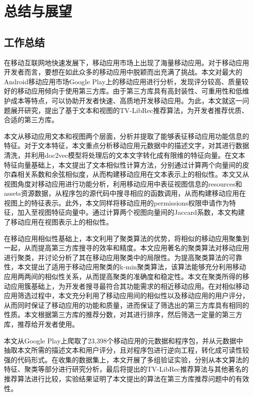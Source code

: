 \chapter{总结与展望}

\section{工作总结}
在移动互联网地快速发展下，移动应用市场上出现了海量移动应用。对于移动应用开发者而言，要想在如此众多的移动应用中脱颖而出充满了挑战。本文对最大的Android移动应用市场Google Play上的移动应用进行分析，发现评分较高、质量较好的移动应用倾向于使用第三方库。由于第三方库具有高封装性、可重用性和低维护成本等特点，可以协助开发者快速、高质地开发移动应用。为此，本文就这一问题展开研究，提出了基于文本和视图的TV-LibRec推荐算法，为开发者推荐优质、合适的第三方库。

本文从移动应用文本和视图两个层面，分析并提取了能够表征移动应用功能信息的特征。对于文本特征，本文重点分析移动应用元数据中的描述文字，对其进行数据清洗，并利用doc2vec模型将处理后的文本文字转化成有限维的特征向量。在文本特征向量基础上，本文提出了文本相似性计算方法，分别通过计算两个向量间的皮尔森相关系数和余弦相似度，从而构建移动应用在文本表示上的相似性。本文又从视图角度对移动应用进行功能分析，利用移动应用中表征视图信息的resources和assets资源数据，从程序包的源代码中搜寻相应的函数调用，从而构建移动应用在视图上的特征表示。此外，本文同样将移动应用的permissions权限申请作为特征，加入至视图特征向量中。通过计算两个视图向量间的Jaccard系数，本文构建了移动应用在视图表示上的相似性。

在移动应用相似性基础上，本文利用了聚类算法的优势，将相似的移动应用聚集到一起，从而提高第三方库搜寻的效率和精度。本文应用著名的聚类算法对移动应用进行聚类，并讨论分析了其在移动应用聚类中的局限性。为提高聚类算法的可靠性，本文提出了适用于移动应用聚类的k-min聚类算法，该算法能够充分利用移动应用两两间的相似性关系，从而提高聚类的准确度和稳定性。本文在聚类所得的移动应用簇基础上，为开发者搜寻最符合其功能需求的相近移动应用。在对相似移动应用筛选过程中，本文充分利用了移动应用间的相似性以及移动应用的用户评分，从而同时保证了移动应用的功能和质量，进而保证了筛选出的第三方库具有相同的性质。本文根据第三方库的推荐分数，对其进行排序，然后筛选一定量的第三方库，推荐给开发者使用。

本文从Google Play上爬取了23,398个移动应用的元数据和程序包，并从元数据中抽取本文所需的描述文本和用户评分，且对程序包进行逆向工程，转化成可读性较强的代码形式。在收集的数据集上，本文开展了多组验证实验，分别从本文算法的特征、聚类等部分进行研究分析，最后将提出的TV-LibRec推荐算法与其他著名的推荐算法进行比较，实验结果证明了本文提出的算法在第三方库推荐问题中的有效性。



